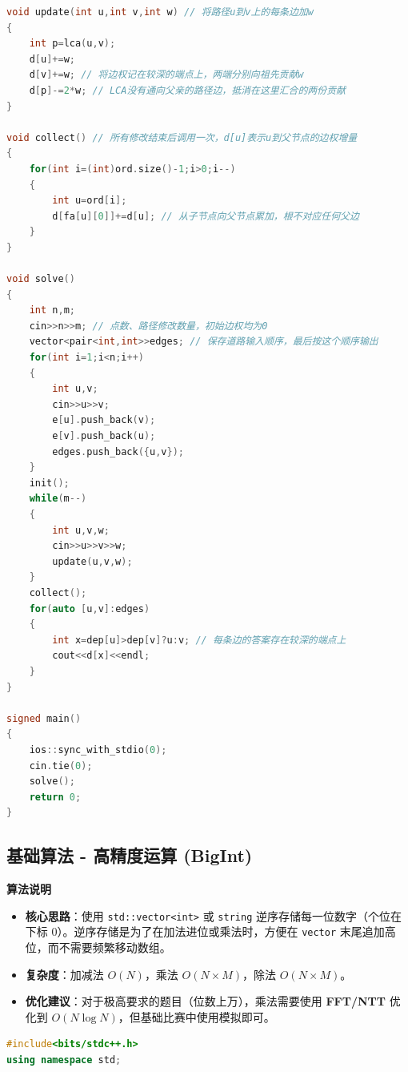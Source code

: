 \documentclass[10pt,landscape,a4paper]{article}
\begin{document}
\begin{multicols*}{3}
\begin{lstlisting}[language=C++]
void update(int u,int v,int w) // 将路径u到v上的每条边加w
{
    int p=lca(u,v);
    d[u]+=w;
    d[v]+=w; // 将边权记在较深的端点上，两端分别向祖先贡献w
    d[p]-=2*w; // LCA没有通向父亲的路径边，抵消在这里汇合的两份贡献
}

void collect() // 所有修改结束后调用一次，d[u]表示u到父节点的边权增量
{
    for(int i=(int)ord.size()-1;i>0;i--)
    {
        int u=ord[i];
        d[fa[u][0]]+=d[u]; // 从子节点向父节点累加，根不对应任何父边
    }
}

void solve()
{
    int n,m;
    cin>>n>>m; // 点数、路径修改数量，初始边权均为0
    vector<pair<int,int>>edges; // 保存道路输入顺序，最后按这个顺序输出
    for(int i=1;i<n;i++)
    {
        int u,v;
        cin>>u>>v;
        e[u].push_back(v);
        e[v].push_back(u);
        edges.push_back({u,v});
    }
    init();
    while(m--)
    {
        int u,v,w;
        cin>>u>>v>>w;
        update(u,v,w);
    }
    collect();
    for(auto [u,v]:edges)
    {
        int x=dep[u]>dep[v]?u:v; // 每条边的答案存在较深的端点上
        cout<<d[x]<<endl;
    }
}

signed main()
{
    ios::sync_with_stdio(0);
    cin.tie(0);
    solve();
    return 0;
}
\end{lstlisting}
\subsection*{基础算法 - 高精度运算 (BigInt)}
\par\addvspace{0.7ex}\noindent\textbf{算法说明}\par\nobreak
\begin{itemize}
\item \textbf{核心思路}：使用 \texttt{s\allowbreak{}t\allowbreak{}d\allowbreak{}:\allowbreak{}:\allowbreak{}v\allowbreak{}e\allowbreak{}c\allowbreak{}t\allowbreak{}o\allowbreak{}r\allowbreak{}\textless{}\allowbreak{}i\allowbreak{}n\allowbreak{}t\allowbreak{}\textgreater{}} 或 \texttt{s\allowbreak{}t\allowbreak{}r\allowbreak{}i\allowbreak{}n\allowbreak{}g} 逆序存储每一位数字（个位在下标 0）。逆序存储是为了在加法进位或乘法时，方便在 \texttt{v\allowbreak{}e\allowbreak{}c\allowbreak{}t\allowbreak{}o\allowbreak{}r} 末尾追加高位，而不需要频繁移动数组。
\item \textbf{复杂度}：加减法 $O(N)$，乘法 $O(N \times M)$，除法 $O(N \times M)$。
\item \textbf{优化建议}：对于极高要求的题目（位数上万），乘法需要使用 \textbf{FFT/NTT} 优化到 $O(N \log N)$，但基础比赛中使用模拟即可。
\end{itemize}
\par{}\par
\begin{lstlisting}[language=C++]
#include<bits/stdc++.h>
using namespace std;


\end{lstlisting}
\end{multicols*}
\end{document}
